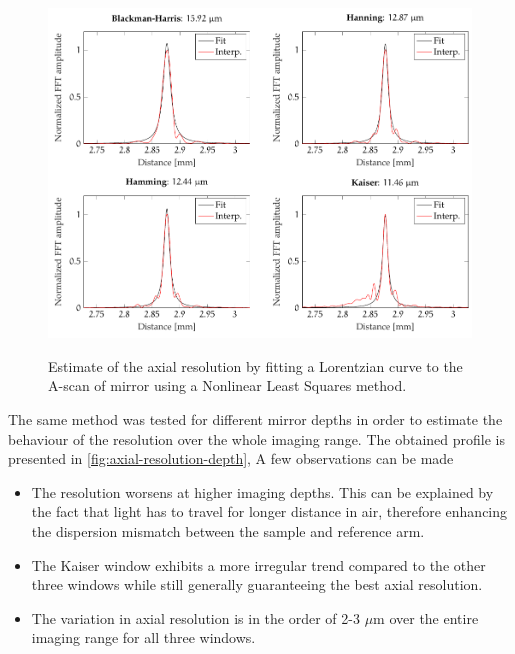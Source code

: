 \begin{figure}[hbt]
	{\myfloatalign
		\includegraphics[width=\linewidth]{gfx/tikz/axial_resolution}}
	\caption{Estimate of the axial resolution by fitting a Lorentzian curve to the A-scan of mirror using a Nonlinear Least Squares method.}\label{fig:axial-resolution}
\end{figure}

The same method was tested for different mirror depths in order to estimate the behaviour of the resolution over the whole imaging range. The obtained profile is presented in \autoref{fig:axial-resolution-depth}, A few observations can be made
\begin{itemize}
	\item The resolution worsens at higher imaging depths. This can be explained by the fact that light has to travel for longer distance in air, therefore enhancing the dispersion mismatch between the sample and reference arm. 
	
	\item The Kaiser window exhibits a more irregular trend compared to the other three windows while still generally guaranteeing the best axial resolution. 
	
	\item The variation in axial resolution is in the order of 2-3 $\mu$m over the entire imaging range for all three windows. 
\end{itemize}

